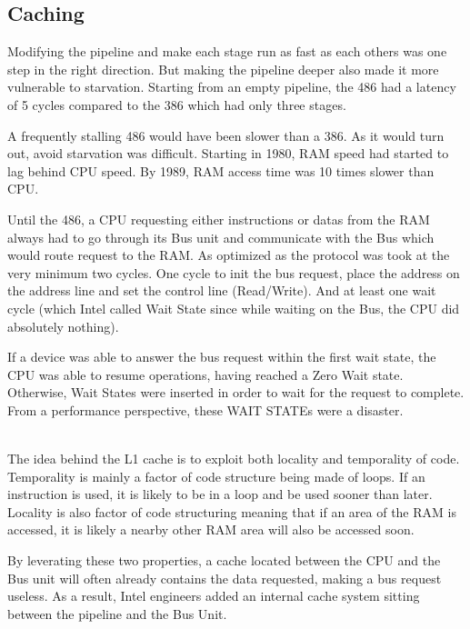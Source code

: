 \subsection{Caching }
Modifying the pipeline and make each stage run as fast as each others was one step in the right direction. But making the pipeline deeper also made it more vulnerable to starvation. Starting from an empty pipeline, the 486 had a latency of 5 cycles compared to the 386 which had only three stages.\\
\par
 A frequently stalling 486 would have been slower than a 386. As it would turn out, avoid starvation was difficult. Starting in 1980, RAM speed had started to lag behind CPU speed. By 1989, RAM access time was 10 times slower than CPU.\\
\par
{}
\par
Until the 486, a CPU requesting either instructions or datas from the RAM always had to go through its Bus unit and communicate with the Bus which would route request to the RAM. As optimized as the protocol was took at the very minimum two cycles. One cycle to init the bus request, place the address on the address line and set the control line (Read/Write). And at least one wait cycle (which Intel called Wait State since while waiting on the Bus, the CPU did absolutely nothing).\\
\par
{}
\par
If a device was able to answer the bus request within the first wait state, the CPU was able to resume operations, having reached a Zero Wait state. Otherwise, Wait States were inserted in order to wait for the request to complete. From a performance perspective, these WAIT STATEs were a disaster.\\\\
\par
{}
The idea behind the L1 cache is to exploit both locality and temporality of code. Temporality is mainly a factor of code structure being made of loops. If an instruction is used, it is likely to be in a loop and be used sooner than later. Locality is also  factor of code structuring meaning that if an area of the RAM is accessed, it is likely a nearby other RAM area will also be accessed soon.\\
\par
By leverating these two properties, a cache located between the CPU and the Bus unit will often already contains the data requested, making a bus request useless. As a result, Intel engineers added an internal cache system sitting between the pipeline and the Bus Unit.\\
\par
{}




